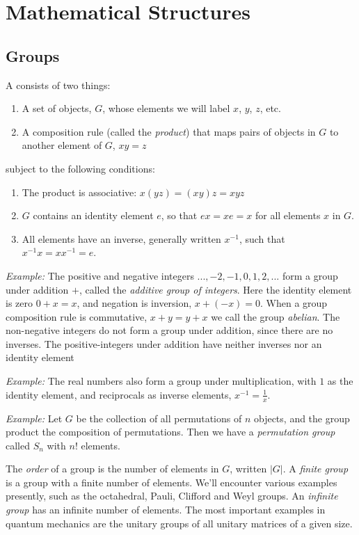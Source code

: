 

\clearpage

\section{Mathematical Structures}

\subsection{Groups}
 A  consists of two things:
 \begin{enumerate}
\item A set of objects, $G$, whose elements we will label $x$, $y$, $z$, etc.
\item A composition rule (called the {\sl product}) that maps pairs of objects in $G$ to another element of $G$, $xy=z$
\end{enumerate}
subject to the following conditions:
\begin{enumerate}
\item The product is associative: $x(yz)= (xy)z= xyz$
\item $G$ contains an identity element $e$, so that $ex=xe=x$ for all elements $x$ in $G$.
\item All elements have an inverse, generally written $x^{-1}$, such that $x^{-1}x = x x^{-1} = e$.
\end{enumerate}

{\sl Example:} The positive and negative integers $..., -2, -1, 0, 1, 2, ...$ form a group under addition $+$, called the {\sl additive group of integers}. Here the identity element is zero $0+x=x$, and negation is inversion, $x+(-x) = 0$. When a group composition rule is commutative, $x+y = y+x$ we call the group {\sl abelian}.
The non-negative integers do not form a group under addition, since there are no inverses. The positive-integers under addition have neither inverses nor an identity element


{\sl Example:} The real numbers also form a group under multiplication, with $1$ as the identity element, and reciprocals as inverse elements, $x^{-1} = \tfrac{1}{x}$.

{\sl Example:} Let $G$ be the collection of all permutations of $n$ objects, and the group product the composition of permutations. Then we have a {\sl permutation group} called $S_n$ with $n!$ elements.
 
The {\sl order} of a group is the number of elements in $G$, written $|G|$. A {\sl finite group} is a group with a finite number of elements. We'll encounter various examples presently, such as the octahedral, Pauli, Clifford and Weyl groups. An {\sl infinite group} has an infinite number of elements. The most important examples in quantum mechanics are the unitary groups of all unitary matrices of a given size. 

